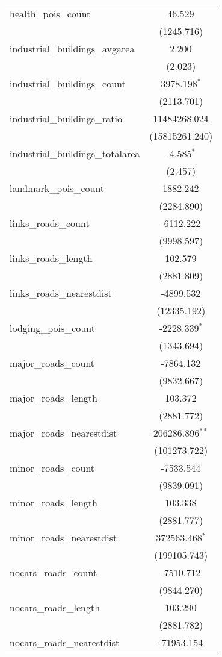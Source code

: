 \begin{table}[!htbp]
\begin{tabular}{@{\extracolsep{5pt}}lc}
 health_pois_count & 46.529$^{}$ \\
  & (1245.716) \\
 industrial_buildings_avgarea & 2.200$^{}$ \\
  & (2.023) \\
 industrial_buildings_count & 3978.198$^{*}$ \\
  & (2113.701) \\
 industrial_buildings_ratio & 11484268.024$^{}$ \\
  & (15815261.240) \\
 industrial_buildings_totalarea & -4.585$^{*}$ \\
  & (2.457) \\
 landmark_pois_count & 1882.242$^{}$ \\
  & (2284.890) \\
 links_roads_count & -6112.222$^{}$ \\
  & (9998.597) \\
 links_roads_length & 102.579$^{}$ \\
  & (2881.809) \\
 links_roads_nearestdist & -4899.532$^{}$ \\
  & (12335.192) \\
 lodging_pois_count & -2228.339$^{*}$ \\
  & (1343.694) \\
 major_roads_count & -7864.132$^{}$ \\
  & (9832.667) \\
 major_roads_length & 103.372$^{}$ \\
  & (2881.772) \\
 major_roads_nearestdist & 206286.896$^{**}$ \\
  & (101273.722) \\
 minor_roads_count & -7533.544$^{}$ \\
  & (9839.091) \\
 minor_roads_length & 103.338$^{}$ \\
  & (2881.777) \\
 minor_roads_nearestdist & 372563.468$^{*}$ \\
  & (199105.743) \\
 nocars_roads_count & -7510.712$^{}$ \\
  & (9844.270) \\
 nocars_roads_length & 103.290$^{}$ \\
  & (2881.782) \\
 nocars_roads_nearestdist & -71953.154$^{}$ \\

\end{tabular}
\end{table}
